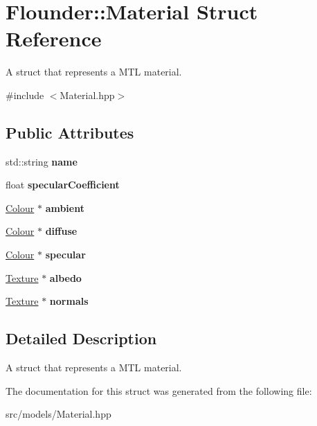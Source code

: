 \hypertarget{struct_flounder_1_1_material}{}\section{Flounder\+:\+:Material Struct Reference}
\label{struct_flounder_1_1_material}


A struct that represents a M\+TL material.  




{\ttfamily \#include $<$Material.\+hpp$>$}

\subsection*{Public Attributes}
\begin{DoxyCompactItemize}
\item 
\mbox{\label{struct_flounder_1_1_material_aef2b31b48c87bd1387ff49d2e55f4b45}} 
std\+::string {\bfseries name}
\item 
\mbox{\label{struct_flounder_1_1_material_a0ff3bd8d36c00ab2bfaf7fd23d25e793}} 
float {\bfseries specular\+Coefficient}
\item 
\mbox{\label{struct_flounder_1_1_material_a274b9956cf09cadcc42f5cc0cb487109}} 
\hyperlink{class_flounder_1_1_colour}{Colour} $\ast$ {\bfseries ambient}
\item 
\mbox{\label{struct_flounder_1_1_material_af7e5801c798f096d2d062bc31712c3ee}} 
\hyperlink{class_flounder_1_1_colour}{Colour} $\ast$ {\bfseries diffuse}
\item 
\mbox{\label{struct_flounder_1_1_material_a3c38d18c4a7771c15e4650f7d9ccc0e0}} 
\hyperlink{class_flounder_1_1_colour}{Colour} $\ast$ {\bfseries specular}
\item 
\mbox{\label{struct_flounder_1_1_material_a4b8fa0c4f4d8798c5222324f7dbd56bd}} 
\hyperlink{class_flounder_1_1_texture}{Texture} $\ast$ {\bfseries albedo}
\item 
\mbox{\label{struct_flounder_1_1_material_abbed68cb068f502924880208d3cf8ace}} 
\hyperlink{class_flounder_1_1_texture}{Texture} $\ast$ {\bfseries normals}
\end{DoxyCompactItemize}


\subsection{Detailed Description}
A struct that represents a M\+TL material. 



The documentation for this struct was generated from the following file\+:\begin{DoxyCompactItemize}
\item 
src/models/Material.\+hpp\end{DoxyCompactItemize}
